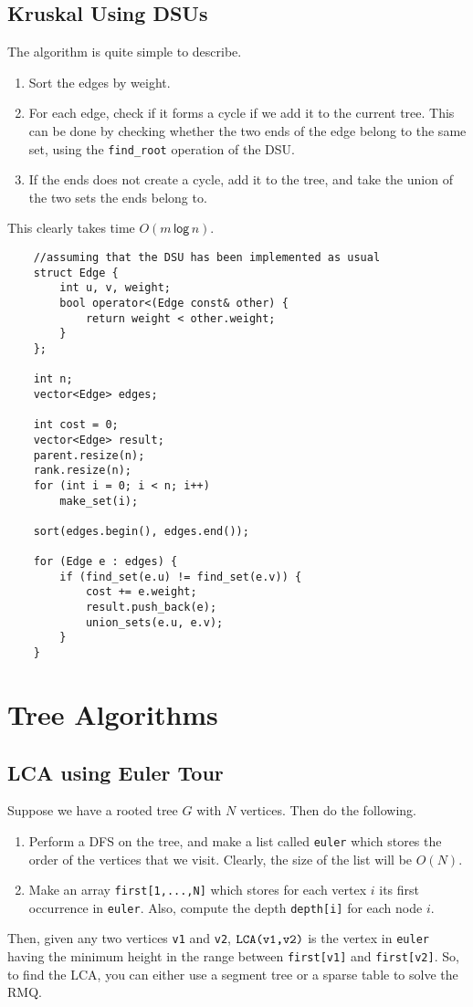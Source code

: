 \documentclass[12pt,a4paper]{amsart}
\numberwithin{equation}{section}
\theoremstyle{definition}
\begin{document}
\subsection{Kruskal Using DSUs} The algorithm is quite simple to describe.
\begin{enumerate}
    \item Sort the edges by weight.
    \item For each edge, check if it forms a cycle if we add it to the current tree. This can be done by checking whether the two ends of the edge belong to the same set, using the \verb|find_root| operation of the DSU.
    \item If the ends does not create a cycle, add it to the tree, and take the union of the two sets the ends belong to. 
\end{enumerate}
This clearly takes time $O(m\mathsf{\,log\,}n)$.

\begin{lstlisting}
    //assuming that the DSU has been implemented as usual
    struct Edge {
        int u, v, weight;
        bool operator<(Edge const& other) {
            return weight < other.weight;
        }
    };

    int n;
    vector<Edge> edges;

    int cost = 0;
    vector<Edge> result;
    parent.resize(n);
    rank.resize(n);
    for (int i = 0; i < n; i++)
        make_set(i);

    sort(edges.begin(), edges.end());

    for (Edge e : edges) {
        if (find_set(e.u) != find_set(e.v)) {
            cost += e.weight;
            result.push_back(e);
            union_sets(e.u, e.v);
        }
    }
\end{lstlisting}

\section{Tree Algorithms}

\subsection{LCA using Euler Tour} Suppose we have a rooted tree $G$ with $N$ vertices. Then do the following. 
\begin{enumerate}
    \item Perform a DFS on the tree, and make a list called \verb|euler| which stores the order of the vertices that we visit. Clearly, the size of the list will be $O(N)$.
    \item Make an array \verb|first[1,...,N]| which stores for each vertex $i$ its first occurrence in \verb|euler|. Also, compute the depth \verb|depth[i]| for each node $i$. 
\end{enumerate}
Then, given any two vertices \verb|v1| and \verb|v2|, $\verb|LCA(v1,v2)|$ is the vertex in \verb|euler| having the minimum height in the range between \verb|first[v1]| and \verb|first[v2]|. So, to find the LCA, you can either use a segment tree or a sparse table to solve the RMQ. 
\end{document}
